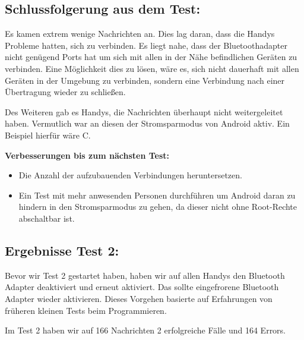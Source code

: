\clearpage\subsection{Schlussfolgerung aus dem
Test:}\label{schlussfolgerung-aus-dem-test}

Es kamen extrem wenige Nachrichten an. Dies lag daran, dass die Handys
Probleme hatten, sich zu verbinden. Es liegt nahe, dass der
Bluetoothadapter nicht genügend Ports hat um sich mit allen in der Nähe
befindlichen Geräten zu verbinden. Eine Möglichkeit dies zu lösen, wäre
es, sich nicht dauerhaft mit allen Geräten in der Umgebung zu verbinden,
sondern eine Verbindung nach einer Übertragung wieder zu schließen.

Des Weiteren gab es Handys, die Nachrichten überhaupt nicht
weitergeleitet haben. Vermutlich war an diesen der Stromsparmodus von
Android aktiv. Ein Beispiel hierfür wäre C.

\textbf{Verbesserungen bis zum nächsten Test:}

\begin{itemize}
\tightlist
\item
  Die Anzahl der aufzubauenden Verbindungen heruntersetzen.
\item
  Ein Test mit mehr anwesenden Personen durchführen um Android daran zu
  hindern in den Stromsparmodus zu gehen, da dieser nicht ohne
  Root-Rechte abschaltbar ist.
\end{itemize}

\clearpage\subsection{Ergebnisse Test 2:}\label{ergebnisse-test-2}

Bevor wir Test 2 gestartet haben, haben wir auf allen Handys den
Bluetooth Adapter deaktiviert und erneut aktiviert. Das sollte
eingefrorene Bluetooth Adapter wieder aktivieren. Dieses Vorgehen
basierte auf Erfahrungen von früheren kleinen Tests beim Programmieren.

Im Test 2 haben wir auf 166 Nachrichten 2 erfolgreiche Fälle und 164
Errors.

